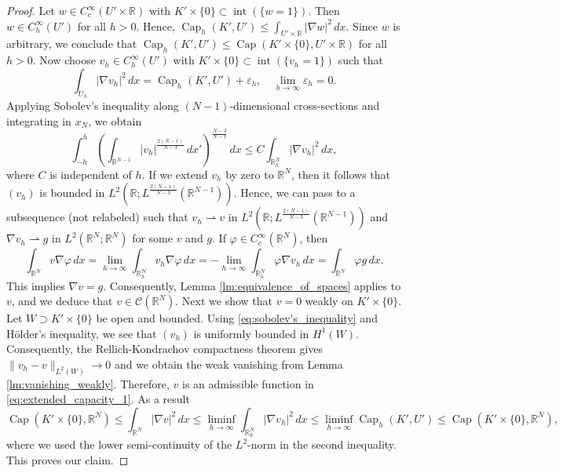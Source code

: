\documentclass{article}
\numberwithin{equation}{section}
\theoremstyle{definition}
\theoremstyle{remark}
\newcommand{\cpct}{\operatorname{Cap}}
\newcommand{\topint}{\operatorname{int}}
\begin{document}
\begin{proof}
    Let $w \in C_c^\infty(U' \times \mathbb{R})$ with $K' \times \{0\} \subset \topint(\{w = 1\})$. Then $w \in C_h^\infty(U')$ for all $h > 0$. Hence, $\cpct_h(K', U') \le \int_{U' \times \mathbb{R}} |\nabla w|^2 \, dx$. Since $w$ is arbitrary, we conclude that $\cpct_h(K', U') \le \cpct(K' \times \{0\}, U' \times \mathbb{R})$ for all $h > 0$. Now choose $v_h \in C_h^\infty(U')$ with $K' \times \{0\} \subset \topint(\{v_h = 1\})$ such that
    \[
    \int_{U_h} |\nabla v_h|^2 \, dx = \cpct_h(K', U') + \varepsilon_h, \quad \lim_{h \to \infty} \varepsilon_h = 0.
    \]
    Applying Sobolev's inequality along $(N - 1)$-dimensional cross-sections and integrating in $x_N$, we obtain 
    \begin{equation} \label{eq:sobolev's_inequality}
        \int_{-h}^h \left(\int_{\mathbb{R}^{N - 1}} |v_h|^\frac{2(N - 1)}{N - 3} \, dx' \right)^\frac{N - 3}{N - 1} \, dx \le C \int_{\mathbb{R}_h^N} |\nabla v_h|^2 \, dx,
    \end{equation}
    where $C$ is independent of $h$. If we extend $v_h$ by zero to $\mathbb{R}^N$, then it follows that $(v_h)$ is bounded in $L^2(\mathbb{R}; L^\frac{2(N - 1)}{N - 3}(\mathbb{R}^{N - 1}))$. Hence, we can pass to a subsequence (not relabeled) such that $v_h \rightharpoonup v$ in $L^2(\mathbb{R}; L^\frac{2(N - 1)}{N - 3}(\mathbb{R}^{N - 1}))$ and $\nabla v_h \rightharpoonup g$ in $L^2(\mathbb{R}^N; \mathbb{R}^N)$ for some $v$ and $g$. If $\varphi \in C_c^\infty(\mathbb{R}^N)$, then
    \[
    \int_{\mathbb{R}^N} v \nabla \varphi \, dx = \lim_{h \to \infty} \int_{\mathbb{R}_h^N} v_h \nabla \varphi \, dx = -\lim_{h \to \infty} \int_{\mathbb{R}_h^N} \varphi \nabla v_h \, dx = \int_{\mathbb{R}^N} \varphi g \, dx.
    \]
    This implies $\nabla v = g$. Consequently, Lemma \ref{lm:equivalence_of_spaces} applies to $v$, and we deduce that $v \in \mathcal{C}(\mathbb{R}^N)$. Next we show that $v = 0$ weakly on $K' \times \{0\}$. Let $W \supset K' \times \{0\}$ be open and bounded. Using \eqref{eq:sobolev's_inequality} and Hölder's inequality, we see that $(v_h)$ is uniformly bounded in $H^1(W)$. Consequently, the Rellich-Kondrachov compactness theorem gives $\|v_h - v\|_{L^2(W)} \to 0$ and we obtain the weak vanishing from Lemma \ref{lm:vanishing_weakly}. Therefore, $v$ is an admissible function in \eqref{eq:extended_capacity_1}. As a result
    \[
    \cpct(K' \times \{0\}, \mathbb{R}^N) \le \int_{\mathbb{R}^N} |\nabla v|^2 \, dx \le \liminf_{h \to \infty} \int_{\mathbb{R}_h^N} |\nabla v_h|^2 \, dx \le \liminf_{h \to \infty} \cpct_h(K', U') \le \cpct(K' \times \{0\}, \mathbb{R}^N),
    \]
    where we used the lower semi-continuity of the $L^2$-norm in the second inequality. This proves our claim.
\end{proof}
\end{document}
